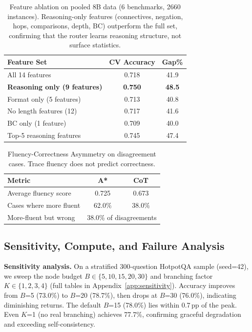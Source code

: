 \documentclass[11pt]{article}
\begin{document}
{\begin{table}[ht]
\centering
\small
\begin{tabular}{lcc}
\toprule
\textbf{Feature Set} & \textbf{CV Accuracy} & \textbf{Gap\%} \\
\midrule
All 14 features & 0.718 & 41.9 \\
\textbf{Reasoning only (9 features)} & \textbf{0.750} & \textbf{48.5} \\
Format only (5 features) & 0.713 & 40.8 \\
No length features (12) & 0.717 & 41.6 \\
BC only (1 feature) & 0.709 & 40.0 \\
Top-5 reasoning features & 0.745 & 47.4 \\
\bottomrule
\end{tabular}
\caption{Feature ablation on pooled 8B data (6 benchmarks, 2660 instances). Reasoning-only features (connectives, negation, hops, comparisons, depth, BC) outperform the full set, confirming that the router learns reasoning structure, not surface statistics.}
\label{tab:feature_ablation}
\end{table}

\begin{table}[t]
\centering
\small
\begin{tabular}{lcc}
\toprule
\textbf{Metric} & \textbf{A*} & \textbf{CoT} \\
\midrule
Average fluency score & 0.725 & 0.673 \\
Cases where more fluent & 62.0\% & 38.0\% \\
More-fluent but wrong & \multicolumn{2}{c}{38.0\% of disagreements} \\
\bottomrule
\end{tabular}
\caption{Fluency-Correctness Asymmetry on disagreement cases. Trace fluency does not predict correctness.}
\label{tab:fluency_asymmetry}
\end{table}

\subsection{Sensitivity, Compute, and Failure Analysis}
\label{sec:sensitivity}

\textbf{Sensitivity analysis.}
On a stratified 300-question HotpotQA sample (seed=42), we sweep the node budget $B \in \{5,10,15,20,30\}$ and branching factor $K \in \{1,2,3,4\}$ (full tables in Appendix~\ref{app:sensitivity}). Accuracy improves from $B$=5 (73.0\%) to $B$=20 (78.7\%), then drops at $B$=30 (76.0\%), indicating diminishing returns. The default $B$=15 (78.0\%) lies within 0.7\,pp of the peak. Even $K$=1 (no real branching) achieves 77.7\%, confirming graceful degradation and exceeding self-consistency.

}
\end{document}
